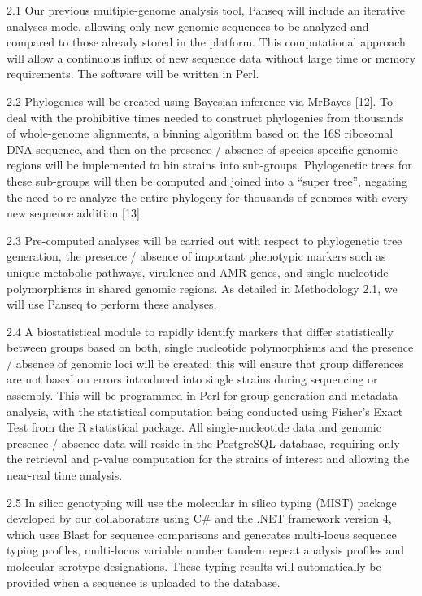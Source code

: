 \documentclass[letterpaper,12pt]{report}
\begin{document}
2.1 Our previous multiple-genome analysis tool, Panseq will include an iterative analyses mode, allowing only new genomic sequences to be analyzed and compared to those already stored in the platform. This computational approach will allow a continuous influx of new sequence data without large time or memory requirements. The software will be written in Perl.
 
2.2 Phylogenies will be created using Bayesian inference via MrBayes [12]. To deal with the prohibitive times needed to construct phylogenies from thousands of whole-genome alignments, a binning algorithm based on the 16S ribosomal DNA sequence, and then on the presence / absence of species-specific genomic regions will be implemented to bin strains into sub-groups. Phylogenetic trees for these sub-groups will then be computed and joined into a “super tree”, negating the need to re-analyze the entire phylogeny for thousands of genomes with every new sequence addition [13].


2.3 Pre-computed analyses will be carried out with respect to phylogenetic tree generation, the presence / absence of important phenotypic markers such as unique metabolic pathways, virulence and AMR genes, and single-nucleotide polymorphisms in shared genomic regions. As detailed in Methodology 2.1, we will use Panseq to perform these analyses.


2.4 A biostatistical module to rapidly identify markers that differ statistically between groups based on both, single nucleotide polymorphisms and the presence / absence of genomic loci will be created; this will ensure that group differences are not based on errors introduced into single strains during sequencing or assembly. This will be programmed in Perl for group generation and metadata analysis, with the statistical computation being conducted using Fisher’s Exact Test from the R statistical package.  All single-nucleotide data and genomic presence / absence data will reside in the PostgreSQL database, requiring only the retrieval and p-value computation for the strains of interest and allowing the near-real time analysis.

 
2.5 In silico genotyping will use the molecular in silico typing (MIST) package developed by our collaborators using C# and the .NET framework version 4, which uses Blast for sequence comparisons and generates multi-locus sequence typing profiles, multi-locus variable number tandem repeat analysis profiles and molecular serotype designations. These typing results will automatically be provided when a sequence is uploaded to the database.
\end{document}
